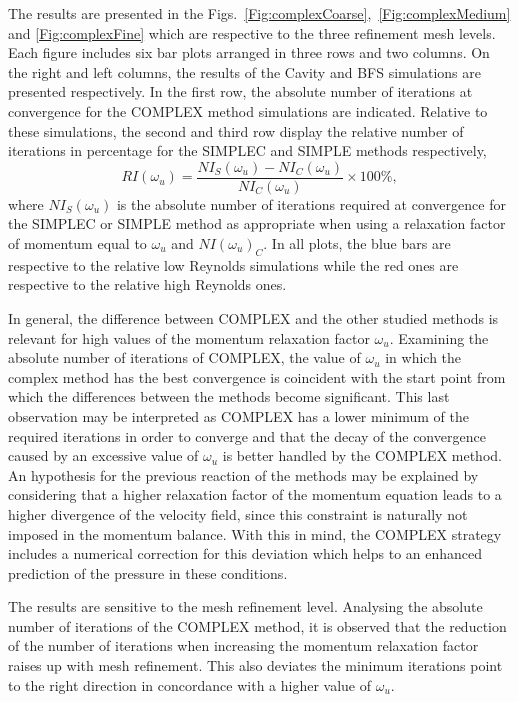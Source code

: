 \documentclass[final,3p,times,11pt,onecolumn]{myElsarticle}
\numberwithin{equation}{section}
\begin{document}
The results are presented in the Figs.~\ref{Fig:complexCoarse},~\ref{Fig:complexMedium} and \ref{Fig:complexFine} which are respective to the three refinement mesh levels. Each figure includes six bar plots arranged in three rows and two columns. On the right and left columns, the results of the Cavity and BFS simulations are presented respectively. In the first row, the absolute number of iterations at convergence for the COMPLEX method simulations are indicated. Relative to these simulations, the second and third row display the relative number of iterations in percentage for the SIMPLEC and SIMPLE methods respectively,
\begin{equation}
RI(\omega_u)
=
\dfrac
{NI_S(\omega_u) - NI_C(\omega_u)}
{NI_C(\omega_u)}
\times
100\%,
\end{equation}
where $NI_S(\omega_u)$ is the absolute number of iterations required at convergence for the SIMPLEC or SIMPLE method as appropriate when using a relaxation factor of momentum equal to $\omega_u$ and $NI(\omega_u)_C$. 
 In all plots, the blue bars are respective to the relative low Reynolds simulations while the red ones are respective to the relative high Reynolds ones.   

In general, the difference between COMPLEX and the other studied methods is relevant for high values of the momentum relaxation factor $\omega_u$. Examining the absolute number of iterations of COMPLEX, the  value of $\omega_u$ in which the complex method has the best convergence is coincident with the start point from which the differences between the methods become significant. This last observation may be interpreted as COMPLEX has a lower minimum of the required iterations in order to converge and that the decay of the convergence caused by an excessive value of $\omega_u$ is better handled by the COMPLEX method. An hypothesis for the previous reaction of the methods may be explained by considering that a higher relaxation factor of the momentum equation leads to a higher divergence of the velocity field, since this constraint is naturally not imposed in the momentum balance. With this in mind, the COMPLEX strategy includes a numerical correction for this deviation which helps to an enhanced prediction of the pressure in these conditions.

The results are sensitive to the mesh refinement level. Analysing the absolute number of iterations of the COMPLEX method, it is observed that the reduction of the number of iterations when increasing the momentum relaxation factor raises up with mesh refinement. This also deviates the minimum iterations point to the right direction in concordance with a higher value of $\omega_u$. 
\end{document}
